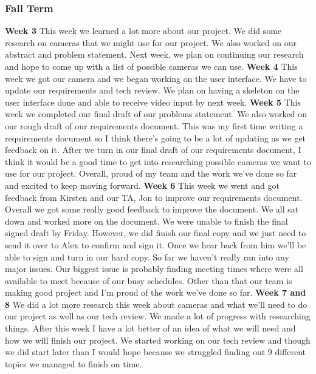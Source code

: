 \documentclass[onecolumn, draftclsnofoot,10pt, compsoc]{IEEEtran}
\begin{document}
\subsubsection{Fall Term}
\textbf{Week 3}
\newline
This week we learned a lot more about our project. We did some research on cameras that we might use for our project. We also worked on our abstract and problem statement. Next week, we plan on continuing our research and hope to come up with a list of possible cameras we can use.
\newline
\textbf{Week 4}
\newline
This week we got our camera and we began working on the user interface. We have to update our requirements and tech review. We plan on having a skeleton on the user interface done and able to receive video input by next week.
\newline
\textbf{Week 5}
\newline
This week we completed our final draft of our problems statement. We also worked on our rough draft of our requirements document. This was my first time writing a requirements document so I think there's going to be a lot of updating as we get feedback on it.
After we turn in our final draft of our requirements document, I think it would be a good time to get into researching possible cameras we want to use for our project.
Overall, proud of my team and the work we've done so far and excited to keep moving forward.
\newline
\textbf{Week 6}
\newline
This week we went and got feedback from Kirsten and our TA, Jon to improve our requirements document. Overall we got some really good feedback to improve the document. We all sat down and worked more on the document. We were unable to finish the final signed draft by Friday. However, we did finish our final copy and we just need to send it over to Alex to confirm and sign it. Once we hear back from him we'll be able to sign and turn in our hard copy.
So far we haven't really ran into any major issues. Our biggest issue is probably finding meeting times where were all available to meet because of our busy schedules. Other than that our team is making good project and I'm proud of the work we've done so far.
\newline
\textbf{Week 7 and 8}
\newline
We did a lot more research this week about cameras and what we'll need to do our project as well as our tech review. We made a lot of progress with researching things. After this week I have a lot better of an idea of what we will need and how we will finish our project. We started working on our tech review and though we did start later than I would hope because we struggled finding out 9 different topics we managed to finish on time.
\end{document}

